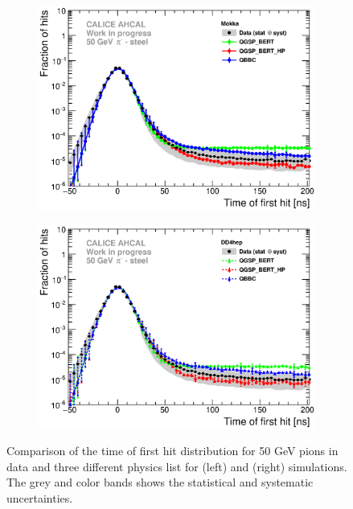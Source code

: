 \begin{figure}[htbp!]
	\begin{subfigure}[t]{0.49\textwidth}
		\centering
		\includegraphics[width=1\textwidth]{../Thesis_Plots/Timing/Pions/Plots/ComparisonToSim/Comparison_SimData_Pion50GeV_LateClusters.eps}
		\caption{}
	\end{subfigure}
	\hfill
	\begin{subfigure}[t]{0.49\textwidth}
		\centering
		\includegraphics[width=1\textwidth]{../Thesis_Plots/Timing/Pions/Plots/ComparisonToSim/Comparison_SimData_Pion50GeV_LateClusters_DD4hep.eps}
		\caption{}
	\end{subfigure}
	\caption{Comparison of the time of first hit distribution for 50 GeV pions in data and three different physics list for \mokka (left) and \ddhep (right) simulations. The grey and color bands shows the statistical and systematic uncertainties.} 	\label{fig:dNdt_SimData_50GeV}
\end{figure}

